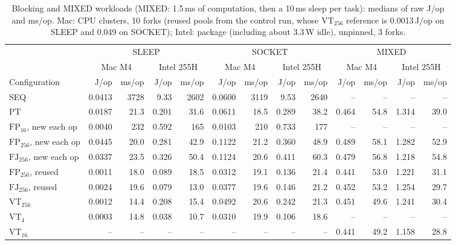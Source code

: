 \begin{table}[tb]
\caption{Blocking and MIXED workloads (MIXED: 1.5\,ms of computation, then a 10\,ms sleep per task): medians of raw J/op and ms/op. Mac: CPU clusters, 10 forks (reused pools from the control run, whose $\mathrm{VT}_{256}$ reference is 0.0013\,J/op on SLEEP and 0.049 on SOCKET); Intel: package (including about 3.3\,W idle), unpinned, 3 forks.}
\label{tab:blocking}
\scriptsize
\setlength{\tabcolsep}{4pt}
\begin{tabular}{@{}lrrrrrrrrrrrr@{}}
\toprule
 & \multicolumn{4}{c}{SLEEP} & \multicolumn{4}{c}{SOCKET} & \multicolumn{4}{c}{MIXED} \\
\cmidrule(lr){2-5}\cmidrule(lr){6-9}\cmidrule(l){10-13}
 & \multicolumn{2}{c}{Mac M4} & \multicolumn{2}{c}{Intel 255H} & \multicolumn{2}{c}{Mac M4} & \multicolumn{2}{c}{Intel 255H} & \multicolumn{2}{c}{Mac M4} & \multicolumn{2}{c}{Intel 255H} \\
\cmidrule(lr){2-3}\cmidrule(lr){4-5}\cmidrule(lr){6-7}\cmidrule(lr){8-9}\cmidrule(lr){10-11}\cmidrule(l){12-13}
Configuration & J/op & ms/op & J/op & ms/op & J/op & ms/op & J/op & ms/op & J/op & ms/op & J/op & ms/op \\
\midrule
SEQ & 0.0413 & 3728 & 9.33 & 2602 & 0.0600 & 3119 & 9.53 & 2640 & -- & -- & -- & -- \\
PT & 0.0187 & 21.3 & 0.201 & 31.6 & 0.0611 & 18.5 & 0.289 & 38.2 & 0.464 & 54.8 & 1.314 & 39.0 \\
$\mathrm{FP}_{16}$, new each op & 0.0040 & 232 & 0.592 & 165 & 0.0103 & 210 & 0.733 & 177 & -- & -- & -- & -- \\
$\mathrm{FP}_{256}$, new each op & 0.0445 & 20.0 & 0.281 & 42.9 & 0.1122 & 21.2 & 0.360 & 48.9 & 0.489 & 58.1 & 1.282 & 52.9 \\
$\mathrm{FJ}_{256}$, new each op & 0.0337 & 23.5 & 0.326 & 50.4 & 0.1124 & 20.6 & 0.411 & 60.3 & 0.479 & 56.8 & 1.218 & 54.8 \\
$\mathrm{FP}_{256}$, reused & 0.0011 & 18.0 & 0.089 & 18.5 & 0.0312 & 19.1 & 0.136 & 21.4 & 0.441 & 53.0 & 1.221 & 31.1 \\
$\mathrm{FJ}_{256}$, reused & 0.0024 & 19.6 & 0.079 & 13.0 & 0.0377 & 19.6 & 0.146 & 21.2 & 0.452 & 53.2 & 1.254 & 29.7 \\
$\mathrm{VT}_{256}$ & 0.0012 & 14.4 & 0.208 & 15.4 & 0.0492 & 20.6 & 0.242 & 21.3 & 0.451 & 49.6 & 1.241 & 30.4 \\
$\mathrm{VT}_4$ & 0.0003 & 14.8 & 0.038 & 10.7 & 0.0310 & 19.9 & 0.106 & 18.6 & -- & -- & -- & -- \\
$\mathrm{VT}_{16}$ & -- & -- & -- & -- & -- & -- & -- & -- & 0.441 & 49.2 & 1.158 & 28.8 \\
\bottomrule
\end{tabular}
\end{table}


